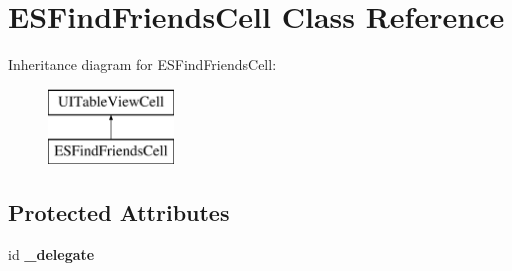 \hypertarget{interface_e_s_find_friends_cell}{}\section{E\+S\+Find\+Friends\+Cell Class Reference}
\label{interface_e_s_find_friends_cell}
Inheritance diagram for E\+S\+Find\+Friends\+Cell\+:\begin{figure}[H]
\begin{center}
\leavevmode
\includegraphics[height=2.000000cm]{interface_e_s_find_friends_cell}
\end{center}
\end{figure}
\subsection*{Protected Attributes}
\begin{DoxyCompactItemize}
\item 
\hypertarget{interface_e_s_find_friends_cell_a400d99697fb6e54f57cdf7d933c1398f}{}id {\bfseries \+\_\+delegate}\label{interface_e_s_find_friends_cell_a400d99697fb6e54f57cdf7d933c1398f}

\end{DoxyCompactItemize}
